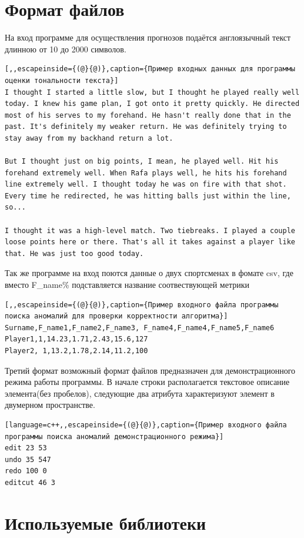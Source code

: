 \section{Формат файлов}
На вход программе для осуществления прогнозов подаётся англоязычный текст длинною от 10 до 2000 символов.
\begin{lstlisting}[,,escapeinside={(@}{@)},caption={Пример входных данных для программы оценки тональности текста}] 
I thought I started a little slow, but I thought he played really well today. I knew his game plan, I got onto it pretty quickly. He directed most of his serves to my forehand. He hasn't really done that in the past. It's definitely my weaker return. He was definitely trying to stay away from my backhand return a lot.

But I thought just on big points, I mean, he played well. Hit his forehand extremely well. When Rafa plays well, he hits his forehand line extremely well. I thought today he was on fire with that shot. Every time he redirected, he was hitting balls just within the line, so...

I thought it was a high-level match. Two tiebreaks. I played a couple loose points here or there. That's all it takes against a player like that. He was just too good today.
\end{lstlisting}

Так же программе на вход поются данные о двух спортсменах в фомате csv,
где вместо F\_name\% подставляется название соотвествующей метрики
\begin{lstlisting}[,,escapeinside={(@}{@)},caption={Пример входного файла программы поиска аномалий для проверки корректности алгоритма}] 
Surname,F_name1,F_name2,F_name3, F_name4,F_name4,F_name5,F_name6
Player1,1,14.23,1.71,2.43,15.6,127
Player2, 1,13.2,1.78,2.14,11.2,100
\end{lstlisting}
Третий формат возможный формат файлов предназначен для демонстрационного режима работы программы. В начале строки располагается текстовое описание элемента(без пробелов), следующие два атрибута характеризуют элемент в двумерном пространстве.
\begin{lstlisting}[language=c++,,escapeinside={(@}{@)},caption={Пример входного файла программы поиска аномалий демонстрационного режима}] 
edit 23 53
undo 35 547
redo 100 0
editcut 46 3
\end{lstlisting}

\section{Используемые библиотеки}

